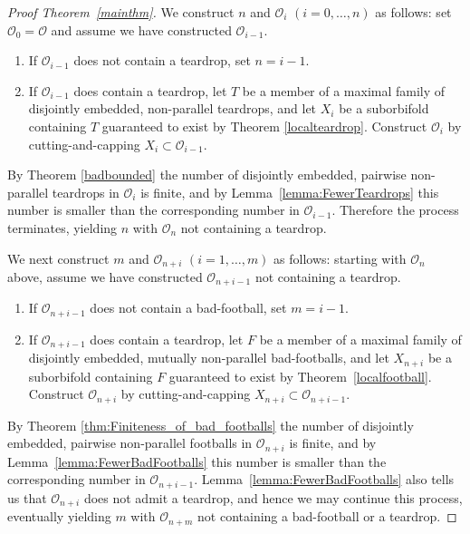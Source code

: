 \documentclass[12pt,reqno]{amsart}
\theoremstyle{plain}
\theoremstyle{definition}
\numberwithin{subcase}{case}
\theoremstyle{plain}
\theoremstyle{definition}
\newcommand{\OO}{\mathcal{O}}
\begin{document}
\begin{proof}[Proof Theorem~\ref{mainthm}]

We construct $n$ and $\OO_{i}$ $(i=0,\dots,n)$ as follows: set $\OO_{0}=\OO$ and assume we have constructed $\OO_{i-1}$.
  \begin{enumerate}
  \item If $\OO_{i-1}$ does not contain a teardrop, set $n=i-1$.
  \item If $\OO_{i-1}$ does contain a teardrop, let \(T\) be a member of a maximal family of disjointly embedded,  non-parallel teardrops, and let $X_i$ be a suborbifold containing \(T\) guaranteed to exist by Theorem \ref{localteardrop}.  Construct \(\OO_{i}\) by  cutting-and-capping $X_{i} \subset \OO_{i-1}$.
  \end{enumerate}
By Theorem \ref{badbounded} the number of disjointly embedded, pairwise non-parallel teardrops in \(\OO_{i}\) is finite, and by Lemma~\ref{lemma:FewerTeardrops} this number is smaller than the corresponding number in \(\OO_{i-1}\).  Therefore the process terminates, yielding  \(n\) with $\OO_{n}$ not containing a teardrop.



\bigskip


\noindent We next construct $m$ and $\OO_{n+i}$ $(i=1,\dots,m)$ as follows: starting with \(\OO_{n}\) above, assume we have constructed $\OO_{n+i-1}$ not containing a teardrop.
  \begin{enumerate}
  \item If $\OO_{n+i-1}$ does not contain a bad-football, set $m=i-1$.
  \item If $\OO_{n+i-1}$ does contain a teardrop, let \(F\) be a member of a maximal family of disjointly embedded, mutually non-parallel bad-footballs, and let $X_{n+i}$ be a suborbifold containing \(F\) guaranteed to exist by Theorem~\ref{localfootball}.  Construct \(\OO_{n+i}\) by cutting-and-capping $X_{n+i} \subset \OO_{n+i-1}$.
  \end{enumerate}
By Theorem \ref{thm:Finiteness_of_bad_footballs} the number of disjointly embedded, pairwise non-parallel footballs in \(\OO_{n+i}\) is finite, and by Lemma~\ref{lemma:FewerBadFootballs} this number is smaller than the corresponding number  in \(\OO_{n+i-1}\). Lemma~\ref{lemma:FewerBadFootballs} also tells us that \(\OO_{n+i}\) does not admit a teardrop, and hence we may continue this process, eventually yielding \(m\) with $\OO_{n+m}$ not containing a bad-football or a teardrop.
\end{proof}
\end{document}
